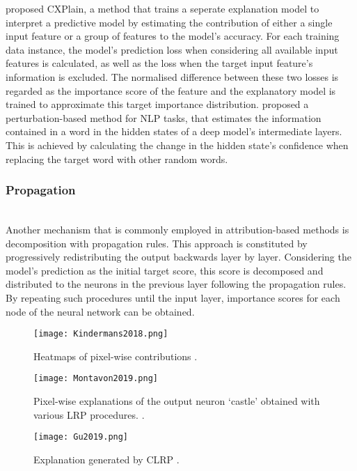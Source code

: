 \documentclass[journal]{IEEEtran}
\begin{document}
\cite{Schwab2019} proposed CXPlain, a method that trains a seperate explanation model to interpret a predictive model by estimating the contribution of either a single input feature or a group of features to the model's accuracy. For each training data instance, the model's prediction loss when considering all available input features is calculated, as well as the loss when the target input feature's information is excluded. The normalised difference between these two losses is regarded as the importance score of the feature and the explanatory model is trained to approximate this target importance distribution.
\cite{Guan2019} proposed a perturbation-based method for NLP tasks, that estimates the information contained in a word in the hidden states of a deep model's intermediate layers. This is achieved by calculating the change in the hidden state's confidence when replacing the target word with other random words.

\subsubsection{Propagation}
\hfill\\
Another mechanism that is commonly employed in attribution-based methods is decomposition with propagation rules. This approach is constituted by progressively redistributing the output backwards layer by layer. Considering the model’s prediction as the initial target score, this score is decomposed and distributed to the neurons in the previous layer following the propagation rules. By repeating such procedures until the input layer, importance scores for each node of the neural network can be obtained. \cite{Yuan2020}

\begin{figure}
  \texttt{[image: Kindermans2018.png]}
  \caption{Heatmaps of pixel-wise contributions \cite{Kindermans2018}.}
\end{figure}

\begin{figure}
  \texttt{[image: Montavon2019.png]}
  \caption{Pixel-wise explanations of the output neuron ‘castle’ obtained with various LRP procedures. \cite{Montavon2019}.}
\end{figure}

\begin{figure}
  \texttt{[image: Gu2019.png]}
  \caption{Explanation generated by CLRP \cite{Gu2019}.}
\end{figure}
\end{document}
